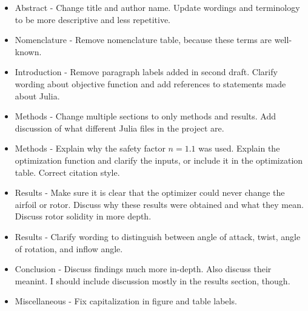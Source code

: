 \documentclass[journal ]{new-aiaa}
\begin{document}
\begin{itemize}
	\item Abstract - Change title and author name. Update wordings and terminology to be more descriptive and less repetitive.
	\item Nomenclature - Remove nomenclature table, because these terms are well-known.
	\item Introduction - Remove paragraph labels added in second draft. Clarify wording about objective function and add references to statements made about Julia.
	\item Methods - Change multiple sections to only methods and results. Add discussion of what different Julia files in the project are.
	\item Methods - Explain why the safety factor $n=1.1$ was used. Explain the optimization function and clarify the inputs, or include it in the optimization table. Correct citation style. 
	\item Results - Make sure it is clear that the optimizer could never change the airfoil or rotor. Discuss why these results were obtained and what they mean. Discuss rotor solidity in more depth.
	\item Results - Clarify wording to distinguish between angle of attack, twist, angle of rotation, and inflow angle.
	\item Conclusion - Discuss findings much more in-depth. Also discuss their meanint. I should include discussion mostly in the results section, though.
	\item Miscellaneous - Fix capitalization in figure and table labels.
\end{itemize}


\end{document}
